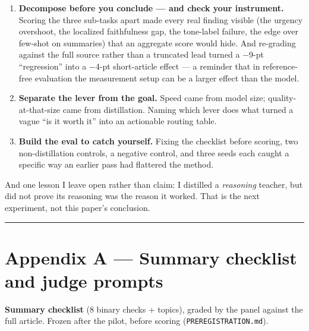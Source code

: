 \documentclass[11pt]{article}
\providecommand{\tightlist}{\setlength{\itemsep}{0pt}\setlength{\parskip}{0pt}}
\providecommand{\tightlist}{%
  \setlength{\itemsep}{0pt}\setlength{\parskip}{0pt}}
\begin{document}
\begin{enumerate}
\def\labelenumi{\arabic{enumi}.}
\tightlist
\item
  \textbf{Decompose before you conclude --- and check your instrument.}
  Scoring the three sub-tasks apart made every real finding visible (the
  urgency overshoot, the localized faithfulness gap, the tone-label
  failure, the edge over few-shot on summaries) that an aggregate score
  would hide. And re-grading against the full source rather than a
  truncated lead turned a −9-pt ``regression'' into a −4-pt
  short-article effect --- a reminder that in reference-free evaluation
  the measurement setup can be a larger effect than the model.
\item
  \textbf{Separate the lever from the goal.} Speed came from model size;
  quality-at-that-size came from distillation. Naming which lever does
  what turned a vague ``is it worth it'' into an actionable routing
  table.
\item
  \textbf{Build the eval to catch yourself.} Fixing the checklist before
  scoring, two non-distillation controls, a negative control, and three
  seeds each caught a specific way an earlier pass had flattered the
  method.
\end{enumerate}

And one lesson I leave open rather than claim: I distilled a
\emph{reasoning} teacher, but did not prove its reasoning was the reason
it worked. That is the next experiment, not this paper's conclusion.

\begin{center}\rule{0.5\linewidth}{0.5pt}\end{center}

\section{Appendix A --- Summary checklist and judge
prompts}\label{appendix-a-summary-checklist-and-judge-prompts}

\textbf{Summary checklist} (8 binary checks + topics), graded by the
panel against the full article. Frozen after the pilot, before scoring
(\texttt{PREREGISTRATION.md}).
\end{document}
